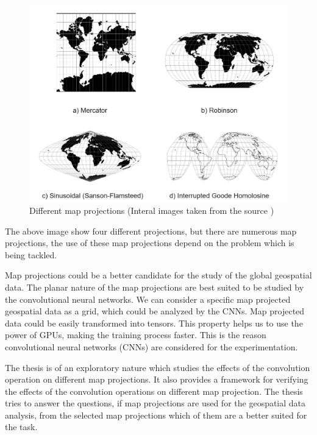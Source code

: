 \begin{figure}[h]
    \centering
    \includegraphics[width=1.0\linewidth]{figures/chapter-1/multi_projections.png}
    \caption{Different map projections (Interal images taken from the source \cite{PROJ_SITE}) }
    \label{fig:multiple-projections}
\end{figure}

The above image show four different projections, but there are numerous map projections, the use of these map projections depend on the problem which is being tackled.

Map projections could be a better candidate for the study of the global geospatial data. The planar nature of the map projections are best suited to be studied by the convolutional neural networks. We can consider a specific map projected geospatial data as a grid, which could be analyzed by the CNNs.
Map projected data could be easily transformed into tensors. This property helps us to use the power of GPUs, making the training process faster. This is the reason convolutional neural networks (CNNs) are considered for the experimentation.

The thesis is of an exploratory nature which studies the effects of the convolution operation on different map projections. It also provides a framework for verifying the effects of the convolution operations on different map projection.
The thesis tries to answer the questions, if map projections are used for the geospatial data analysis, from the selected map projections which of them are a better suited for the task.